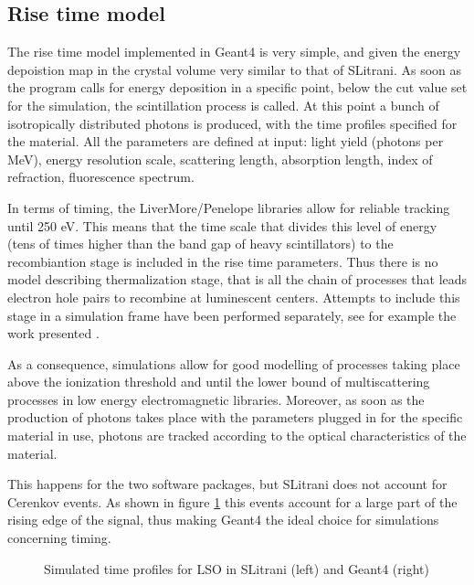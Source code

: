\subsection{Rise time model}
The rise time model implemented in Geant4 is very simple, and given the energy depoistion map in the crystal volume very similar to that of SLitrani. 
As soon as the program calls for energy deposition in a specific point, below the cut value set for the simulation, the scintillation process is called. 
At this point a bunch of isotropically distributed photons is produced, with the time profiles specified for the material.
All the parameters are defined at input: light yield (photons per MeV), energy resolution scale, scattering length, absorption length, index of refraction, fluorescence spectrum. 

In terms of timing, the LiverMore/Penelope libraries allow for reliable tracking until 250 eV. This means that the time scale that divides this level of energy (tens of times higher than the band gap of heavy scintillators) to the recombiantion stage is included in the rise time parameters. Thus there is no model describing thermalization stage, that is all the chain of processes that leads electron hole pairs to recombine at luminescent centers. Attempts to include this stage in a simulation frame have been performed separately, see for example the work presented \cite{Vasiliev2013}.

As a consequence, simulations allow for good modelling of processes taking place above the ionization threshold and until the lower bound of multiscattering processes in low energy electromagnetic libraries. Moreover, as soon as the production of photons takes place with the parameters plugged in for the specific material in use, photons are tracked according to the optical characteristics of the material.

This happens for the two software packages, but SLitrani does not account for Cerenkov events. As shown in figure \ref{fig:scint_cer} this events account for a large part of the rising edge of the signal, thus making Geant4 the ideal choice for simulations concerning timing.
\begin{figure}[htbp]
\begin{center}
\end{center}
\caption[Simulated time profiles for LSO]{Simulated time profiles for LSO in SLitrani (left) and Geant4 (right)}
\label{fig:scint_cer}
\end{figure}

